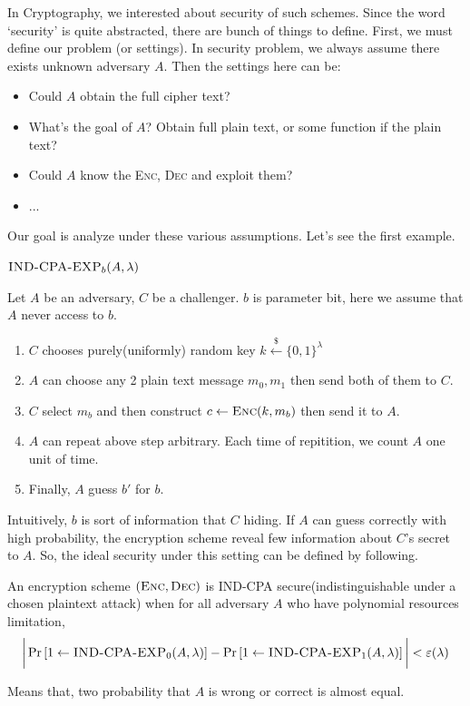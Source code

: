 \documentclass[12pt, a4paper, openany, twoside]{book}
\theoremstyle{definition}
\theoremstyle{remark}
\theoremstyle{plain}
\numberwithin{equation}{section}
\begin{document}
In Cryptography, we interested about security of such schemes. Since the word \lq security' is quite abstracted, 
there are bunch of things to define. First, we must define our problem (or settings). 
In security problem, we always assume there exists unknown adversary $A$. Then the settings here can be: 
\begin{itemize}
    \item Could $A$ obtain the full cipher text?
    \item What's the goal of $A$? Obtain full plain text, or some function if the plain text?
    \item Could $A$ know the \textsc{Enc, Dec} and exploit them? 
    \item ...
\end{itemize}

Our goal is analyze under these various assumptions. Let's see the first example. 

\begin{tcolorbox}[colback=yellow!10!white,colframe=blue!75!white,title=Indistinguishability Chosen Plaintext Attck]
$\textsc{IND-CPA-EXP}_b(A, \lambda)$

Let $A$ be an adversary, $C$ be a challenger. $b$ is parameter bit, here we assume that $A$ never access to $b$. 
\begin{enumerate}
    \item $C$ chooses purely(uniformly) random key $k \xleftarrow{\mathdollar} \{0,1\}^\lambda$
    \item $A$ can choose any 2 plain text message $m_0, m_1$ then send both of them to $C$. 
    \item $C$ select $m_b$ and then construct $c \gets \textsc{Enc}(k, m_b)$ then send it to $A$. 
    \item $A$ can repeat above step arbitrary. Each time of repitition, we count $A$ one unit of time. 
    \item Finally, $A$ guess $b'$ for $b$. 
\end{enumerate}

\end{tcolorbox}

Intuitively, $b$ is sort of information that $C$ hiding. If $A$ can guess correctly with high probability, the encryption scheme reveal 
few information about $C$'s secret to $A$. So, the ideal security under this setting can be defined by following.

\begin{tcolorbox}[colback=yellow!10!white,colframe=brown!75!black,title=Indistinguishable under Chosen Plaintext Attack]

An encryption scheme $(\textsc{Enc}, \textsc{Dec})$ is \textsc{IND-CPA} secure(indistinguishable under a chosen plaintext attack) 
when for all adversary $A$ who have polynomial resources limitation, 
\[\bigg| \Pr\left[1 \gets \textsc{IND-CPA-EXP}_0(A, \lambda)\right] - \Pr\left[1 \gets \textsc{IND-CPA-EXP}_1(A, \lambda)\right]\bigg| < \varepsilon(\lambda)\]

Means that, two probability that $A$ is wrong or correct is almost equal. 

\end{tcolorbox}
\end{document}
